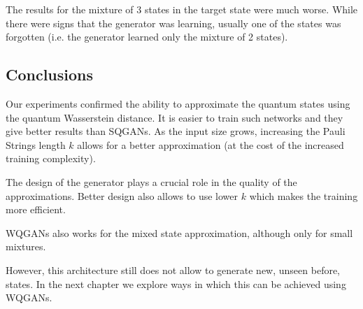 The results for the mixture of 3 states in the target state were much worse. While
there were signs that the generator was learning, usually one of the
states was forgotten (i.e. the generator learned only the mixture of 2 states).

\subsection{Conclusions}
Our experiments confirmed the ability to approximate the quantum states using the
quantum Wasserstein distance. It is easier to train such networks and they give
better results than SQGANs. As the input size grows, increasing the Pauli
Strings length $k$ allows for a better approximation (at the cost of the increased
training complexity).

The design of the generator plays a crucial role in the quality of the
approximations. Better design also allows to use lower $k$ which makes the
training more efficient.

WQGANs also works for the mixed state approximation, although only for small
mixtures.

However, this architecture still does not allow to generate new, unseen before,
states. In the next chapter we explore ways in which this can be achieved using WQGANs. 

